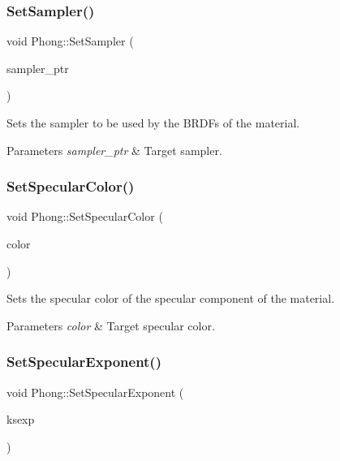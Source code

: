 \subsubsection{\texorpdfstring{Set\+Sampler()}{SetSampler()}\hspace{0.1cm}{\footnotesize\ttfamily [2/2]}}
{\footnotesize\ttfamily void Phong\+::\+Set\+Sampler (\begin{DoxyParamCaption}\item[{std\+::shared\+\_\+ptr$<$ \hyperlink{class_sampler}{Sampler} $>$}]{sampler\+\_\+ptr }\end{DoxyParamCaption})\hspace{0.3cm}{\ttfamily [inline]}}

Sets the sampler to be used by the B\+R\+D\+Fs of the material. 
\begin{DoxyParams}{Parameters}
{\em sampler\+\_\+ptr} & Target sampler. \\
\hline
\end{DoxyParams}
\hypertarget{group___materials_gaed8372d4e59cb7c1b781979c4ea9ee80}{}\label{group___materials_gaed8372d4e59cb7c1b781979c4ea9ee80} 
\subsubsection{\texorpdfstring{Set\+Specular\+Color()}{SetSpecularColor()}}
{\footnotesize\ttfamily void Phong\+::\+Set\+Specular\+Color (\begin{DoxyParamCaption}\item[{const \hyperlink{class_r_g_b_color}{R\+G\+B\+Color} \&}]{color }\end{DoxyParamCaption})\hspace{0.3cm}{\ttfamily [inline]}}

Sets the specular color of the specular component of the material. 
\begin{DoxyParams}{Parameters}
{\em color} & Target specular color. \\
\hline
\end{DoxyParams}
\hypertarget{group___materials_ga167d70d514005d94a0bede7d7b12f372}{}\label{group___materials_ga167d70d514005d94a0bede7d7b12f372} 
\subsubsection{\texorpdfstring{Set\+Specular\+Exponent()}{SetSpecularExponent()}}
{\footnotesize\ttfamily void Phong\+::\+Set\+Specular\+Exponent (\begin{DoxyParamCaption}\item[{const float}]{ksexp }\end{DoxyParamCaption})\hspace{0.3cm}{\ttfamily [inline]}}

